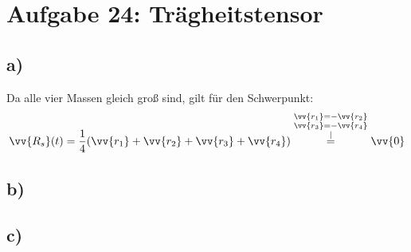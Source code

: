 \documentclass[a4paper,12pt]{article}
\begin{document}
\section*{Aufgabe 24: Trägheitstensor}
\subsection*{a)} Da alle vier Massen gleich groß sind, gilt für den Schwerpunkt:
$$\vv{R_s}(t)=\frac14 (\vv{r_1}+\vv{r_2}+\vv{r_3}+\vv{r_4})\overset{\substack{\substack{\vv{r_1}=-\vv{r_2}\\ \vv{r_3}=-\vv{r_4}}\\|}}{=}\vv{0}$$
\subsection*{b)}
\subsection*{c)}
\end{document}

